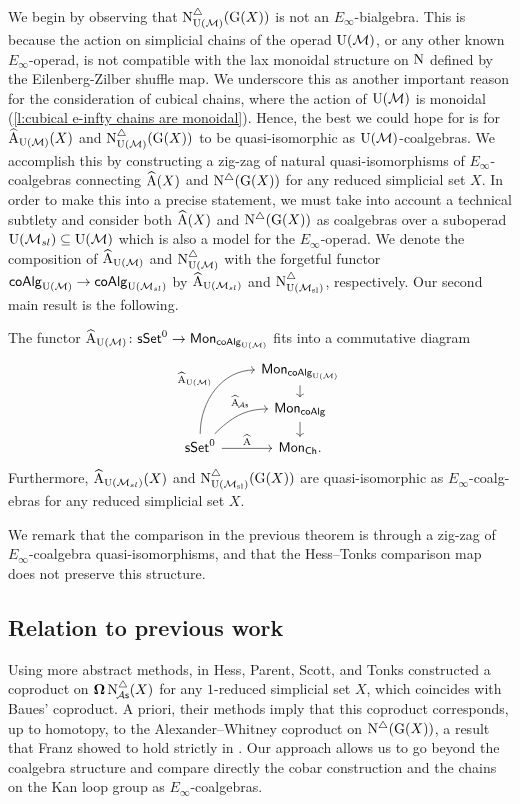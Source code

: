We begin by observing that $\operatorname{N^{\triangle}_{{\operatorname{U}(\mathcal{M})}}}(\operatorname{G}(X))$ is not an $E_\infty$-bialgebra.
This is because the action on simplicial chains of the operad ${\operatorname{U}(\mathcal{M})}$, or any other known $E_\infty$-operad, is not compatible with the lax monoidal structure on $\operatorname{N}$ defined by the Eilenberg-Zilber shuffle map.
We underscore this as another important reason for the consideration of cubical chains, where the action of ${\operatorname{U}(\mathcal{M})}$ is monoidal (\cref{l:cubical e-infty chains are monoidal}).
Hence, the best we could hope for is for $\operatorname{\widehat{A}_{{\operatorname{U}(\mathcal{M})}}}(X)$ and $\operatorname{N^{\triangle}_{{\operatorname{U}(\mathcal{M})}}}(\operatorname{G}(X))$ to be quasi-isomorphic as ${\operatorname{U}(\mathcal{M})}$-coalgebras.
We accomplish this by constructing a zig-zag of natural quasi-isomorphisms of $E_{\infty}$-coalgebras connecting $\operatorname{\widehat{A}}(X)$ and $\operatorname{N^{\triangle}}(\operatorname{G}(X))$ for any reduced simplicial set $X$.
In order to make this into a precise statement, we must take into account a technical subtlety and consider both $\operatorname{\widehat{A}}(X)$ and $\operatorname{N^{\triangle}}(\operatorname{G}(X))$ as coalgebras over a suboperad ${\operatorname{U}(\mathcal{M}_{sl})} \subseteq {\operatorname{U}(\mathcal{M})}$ which is also a model for the $E_\infty$-operad.
We denote the composition of $\operatorname{\widehat{A}_{{\operatorname{U}(\mathcal{M})}}}$ and $\operatorname{N^{\triangle}_{{\operatorname{U}(\mathcal{M})}}}$ with the forgetful functor $\mathsf{coAlg}_{\operatorname{U}(\mathcal{M})} \to \mathsf{coAlg}_{\operatorname{U}(\mathcal{M}_{sl})}$ by $\operatorname{\widehat{A}}_{\operatorname{U}(\mathcal{M}_{sl})}$ and $\operatorname{N^{\triangle}_{{\operatorname{U}(\mathcal{M}_{sl})}}}$, respectively.
Our second main result is the following.

\begin{theorem} \label{t:2nd main thm in the intro}
	The functor $\operatorname{\widehat{A}_{{\operatorname{U}(\mathcal{M})}}} \colon \mathsf{sSet}^0 \to \mathsf{Mon}_{\mathsf{coAlg}_{\operatorname{U}(\mathcal{M})}}$ fits into a commutative diagram
	\[
	\begin{tikzcd}[row sep=small]
	& \Mon_{\coAlg_\UM} \arrow[d] \\
	& \Mon_{\coAlg} \arrow[d] \\
	\sSet^0
	\arrow[r, "\adamsE", ]
	\arrow[ru, "\adamsEA", out=45, in=180, near end]
	\arrow[ruu, "\adamsEUM", out=90, in=180]
	& \Mon_{\Ch}.
	\end{tikzcd}
	\]
	Furthermore, $\operatorname{\widehat{A}}_{\operatorname{U}(\mathcal{M}_{sl})}(X)$ and $\operatorname{N^{\triangle}_{{\operatorname{U}(\mathcal{M}_{sl})}}}(\operatorname{G}(X))$ are quasi-isomorphic as $E_\infty$-coalg-ebras for any reduced simplicial set $X$.
\end{theorem}

We remark that the comparison in the previous theorem is through a zig-zag of $E_\infty$-coalgebra quasi-isomorphisms, and that the Hess--Tonks comparison map does not preserve this structure.

\subsection*{Relation to previous work}

Using more abstract methods, in \cite{hess2006adamshilton} Hess, Parent, Scott, and Tonks constructed a coproduct on $\operatorname{\mathbf{\Omega}} \operatorname{N^{\triangle}_{\!{\mathcal{A}\mathsf{s}}}}(X)$ for any $1$-reduced simplicial set $X$, which coincides with Baues' coproduct.
A priori, their methods imply that this coproduct corresponds, up to homotopy, to the Alexander--Whitney coproduct on $\operatorname{N^{\triangle}}(\operatorname{G}(X))$, a result that Franz showed to hold strictly in \cite{franz2020szczarba}.
Our approach allows us to go beyond the coalgebra structure and compare directly the cobar construction and the chains on the Kan loop group as $E_{\infty}$-coalgebras.

